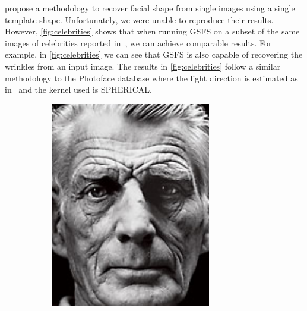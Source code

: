 \citet{kemelmacher2011facereconstruction} propose a methodology to recover
facial shape from single images using a single template shape. Unfortunately, we
were unable to reproduce their results. However, \cref{fig:celebrities} shows
that when running GSFS on a subset of the same images of celebrities reported
in~\citet{kemelmacher2011facereconstruction}, we can achieve comparable results.
For example, in \cref{fig:celebrities} we can see that GSFS is also
capable of recovering the wrinkles from an input image. The results in
\cref{fig:celebrities} follow a similar methodology to the Photoface database
where the light direction is estimated as
in~\citet{kemelmacher2011facereconstruction} and the kernel used is SPHERICAL\@.
\begin{figure}
    \centering
    \begin{subfigure}{0.23\textwidth}
        \centering
        \includegraphics[width=\textwidth]{statistical_normals/images/gsfs_results/celebrities/samuel_beckett.png}
\label{fig:samuel-beckett-input}

\end{subfigure}
\end{figure}

